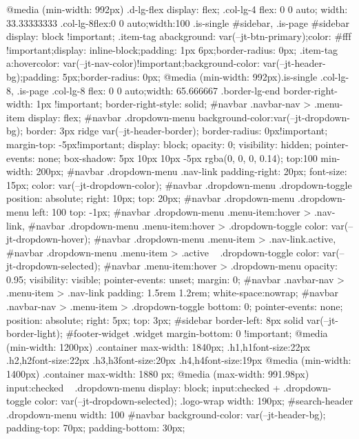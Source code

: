 @media (min-width: 992px) {
.d-lg-flex {
display: flex;
}
.col-lg-4 {
flex: 0 0 auto;
width: 33.33333333%
}
.col-lg-8{flex:0 0 auto;width:100%
.is-single #sidebar, .is-page #sidebar {display: block !important;}
.item-tag a{background: var(--jt-btn-primary);color: #fff !important;display: inline-block;padding: 1px 6px;border-radius: 0px;}
.item-tag a:hover{color: var(--jt-nav-color)!important;background-color: var(--jt-header-bg);padding: 5px;border-radius: 0px;}
@media (min-width: 992px){.is-single  .col-lg-8, .is-page  .col-lg-8 {flex: 0 0 auto;width: 65.666667%
.border-lg-end {
border-right-width: 1px !important;
border-right-style: solid;
}
#navbar .navbar-nav > .menu-item {
display: flex;
}
#navbar .dropdown-menu {
background-color:var(--jt-dropdown-bg);
border: 3px ridge var(--jt-header-border);
border-radius: 0px!important;
margin-top: -5px!important;
display: block;
opacity: 0;
visibility: hidden;
pointer-events: none;
box-shadow: 5px 10px 10px -5px rgba(0, 0, 0, 0.14);
top:100%
min-width: 200px;
}
#navbar .dropdown-menu .nav-link {
padding-right: 20px;
font-size: 15px;
color: var(--jt-dropdown-color);
}
#navbar .dropdown-menu .dropdown-toggle {
position: absolute;
right: 10px;
top: 20px;
}
#navbar .dropdown-menu .dropdown-menu {
left: 100%
top: -1px;
}
#navbar .dropdown-menu .menu-item:hover > .nav-link,
#navbar .dropdown-menu .menu-item:hover > .dropdown-toggle {
color:  var(--jt-dropdown-hover);
}
#navbar .dropdown-menu .menu-item > .nav-link.active,
#navbar .dropdown-menu .menu-item > .active ~ .dropdown-toggle {
color:  var(--jt-dropdown-selected);
}
#navbar .menu-item:hover > .dropdown-menu {
opacity: 0.95;
visibility: visible;
pointer-events: unset;
margin: 0;
}
#navbar .navbar-nav > .menu-item > .nav-link {
padding: 1.5rem 1.2rem;
white-space:nowrap;
}
#navbar .navbar-nav > .menu-item > .dropdown-toggle {
bottom: 0;
pointer-events: none;
position: absolute;
right: 5px;
top: 3px;
}
#sidebar {
border-left: 8px solid var(--jt-border-light);
}
#footer-widget .widget {
margin-bottom: 0 !important;
}
}
@media (min-width: 1200px){
.container {
max-width: 1840px;
}
.h1,h1{font-size:22px}
.h2,h2{font-size:22px}
.h3,h3{font-size:20px}
.h4,h4{font-size:19px}
}
@media (min-width: 1400px) {
.container {
max-width: 1880 px;
}
}
@media (max-width: 991.98px) {
input:checked ~ .dropdown-menu {
display: block;
}
input:checked + .dropdown-toggle {
color: var(--jt-dropdown-selected);
}
.logo-wrap {
width: 190px;
}
#search-header .dropdown-menu{
width: 100%
}
#navbar {
background-color: var(--jt-header-bg);
padding-top: 70px;
padding-bottom: 30px;
}}}}}
